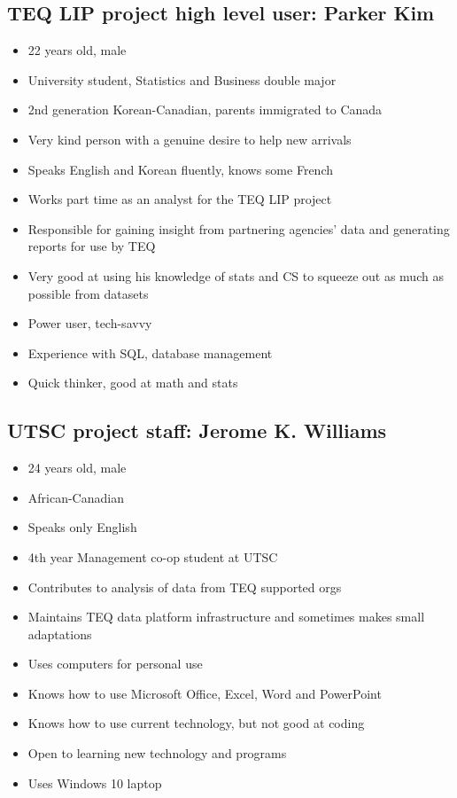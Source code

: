\documentclass[]{scrartcl}
\begin{document}
\subsection{TEQ LIP project high level user: Parker Kim}
\begin{itemize}
	\item 22 years old, male
	\item University student, Statistics and Business double major
	\item 2nd generation Korean-Canadian, parents immigrated to Canada
	\item Very kind person with a genuine desire to help new arrivals
	\item Speaks English and Korean fluently, knows some French
	\item Works part time as an analyst for the TEQ LIP project
	\item Responsible for gaining insight from partnering agencies' data and generating reports for use by TEQ
	\item Very good at using his knowledge of stats and CS to squeeze out as much as possible from datasets
	\item Power user, tech-savvy 
	\item Experience with SQL, database management
	\item Quick thinker, good at math and stats
\end{itemize}

\subsection{UTSC project staff: Jerome K. Williams}
\begin{itemize}
	\item 24 years old, male
	\item African-Canadian
	\item Speaks only English
	\item 4th year Management co-op student at UTSC
	\item Contributes to analysis of data from TEQ supported orgs
	\item Maintains TEQ data platform infrastructure and sometimes makes small adaptations
	\item Uses computers for personal use
	\item Knows how to use Microsoft Office, Excel, Word and PowerPoint
	\item Knows how to use current technology, but not good at coding
	\item Open to learning new technology and programs
	\item Uses Windows 10 laptop
\end{itemize}
\end{document}
